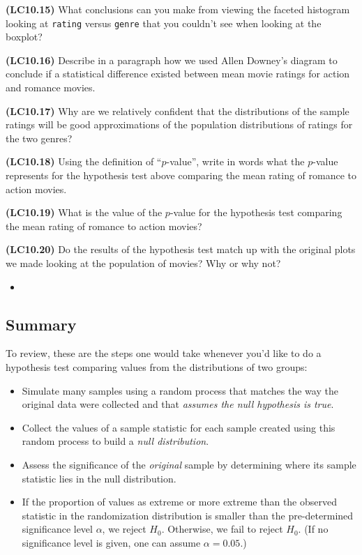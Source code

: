 \documentclass[12pt, krantz2,]{krantz}
\newenvironment{rmdblock}[1]
  {\begin{shaded*}
  \begin{itemize}
  \renewcommand{\labelitemi}{
    \raisebox{-.7\height}[0pt][0pt]{
    }
  }
  \item
  }
  {
  \end{itemize}
  \end{shaded*}
  }
\newenvironment{learncheck}
  {\begin{rmdblock}{warning}}
  {\end{rmdblock}}
\begin{document}
\textbf{(LC10.15)} What conclusions can you make from viewing the faceted histogram looking at \texttt{rating} versus \texttt{genre} that you couldn't see when looking at the boxplot?

\textbf{(LC10.16)} Describe in a paragraph how we used Allen Downey's diagram to conclude if a statistical difference existed between mean movie ratings for action and romance movies.

\textbf{(LC10.17)} Why are we relatively confident that the distributions of the sample ratings will be good approximations of the population distributions of ratings for the two genres?

\textbf{(LC10.18)} Using the definition of ``\(p\)-value'', write in words what the \(p\)-value represents for the hypothesis test above comparing the mean rating of romance to action movies.

\textbf{(LC10.19)} What is the value of the \(p\)-value for the hypothesis test comparing the mean rating of romance to action movies?

\textbf{(LC10.20)} Do the results of the hypothesis test match up with the original plots we made looking at the population of movies? Why or why not?

\begin{learncheck}

\end{learncheck}

\hypertarget{summary-5}{%
\subsection{Summary}\label{summary-5}}

To review, these are the steps one would take whenever you'd like to do a hypothesis test comparing
values from the distributions of two groups:

\begin{itemize}
\item
  Simulate many samples using a random process that matches the way
  the original data were collected and that \emph{assumes the null hypothesis is
  true}.
\item
  Collect the values of a sample statistic for each sample created using this random process to build
  a \emph{null distribution}.
\item
  Assess the significance of the \emph{original} sample by determining where
  its sample statistic lies in the null distribution.
\item
  If the proportion of values as extreme or more extreme than the observed statistic in the randomization
  distribution is smaller than the pre-determined significance level \(\alpha\), we reject \(H_0\). Otherwise,
  we fail to reject \(H_0\). (If no significance level is given, one can assume \(\alpha = 0.05\).)
\end{itemize}
\end{document}
